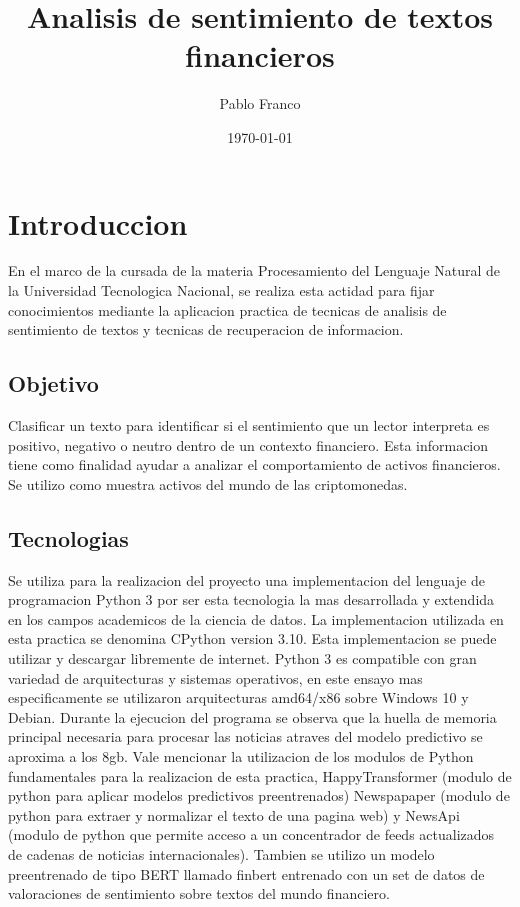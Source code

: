 \documentclass[12pt,man]{apa7}
\title{Analisis de sentimiento de textos financieros}
\author{Pablo Franco}
\affiliation{Universidad Tecnologica Ncional}
\date{\today}
\begin{document}
\maketitle
\section{Introduccion}\label{sec:introduccion}
En el marco de la cursada de la materia Procesamiento del
Lenguaje Natural de la Universidad Tecnologica Nacional,
se realiza esta actidad para fijar conocimientos
mediante la aplicacion practica de tecnicas de analisis de
sentimiento de textos y tecnicas de recuperacion de informacion.
\subsection{Objetivo}\label{subsec:objetivo}
Clasificar un texto para identificar si el sentimiento
que un lector interpreta es positivo, negativo o neutro
dentro de un contexto financiero.
Esta informacion tiene como finalidad ayudar a
analizar el comportamiento de activos financieros.
Se utilizo como muestra activos del mundo de las
criptomonedas.
\subsection{Tecnologias}\label{subsec:tecnologias}
Se utiliza para la realizacion del proyecto una implementacion
del lenguaje de programacion Python 3 por ser esta tecnologia
la mas desarrollada y extendida en los campos academicos de la ciencia de datos.
La implementacion utilizada en esta practica se denomina CPython version 3.10.
Esta implementacion se puede utilizar y descargar libremente de internet.
Python 3 es compatible con gran variedad de arquitecturas y sistemas operativos,
en este ensayo mas especificamente se utilizaron arquitecturas amd64/x86 sobre Windows 10 y Debian.
Durante la ejecucion del programa se observa que la huella de memoria principal necesaria
para procesar las noticias atraves del modelo predictivo se aproxima a los 8gb.
Vale mencionar la utilizacion de los modulos de Python fundamentales para la
realizacion de esta practica, HappyTransformer (modulo de python para aplicar modelos
predictivos preentrenados)
Newspapaper (modulo de python para extraer y normalizar el texto de una pagina web) y
NewsApi (modulo de python que permite acceso a un concentrador de feeds actualizados
de cadenas de noticias internacionales).
Tambien se utilizo un modelo preentrenado de tipo BERT llamado finbert entrenado con
un set de datos de valoraciones de sentimiento sobre textos del mundo financiero.
\end{document}
